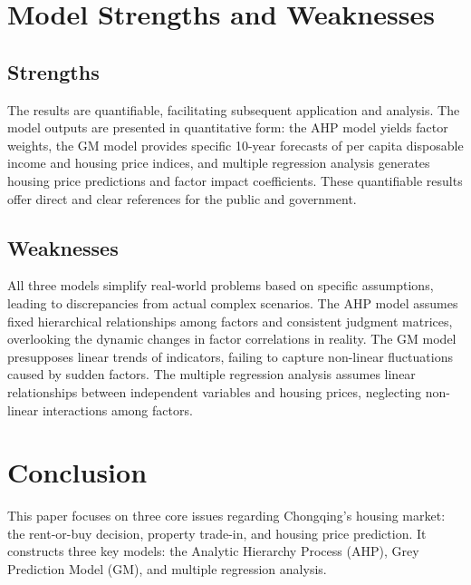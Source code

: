 \documentclass{mcmthesis}
\begin{document}
\section{Model Strengths and Weaknesses} %

\subsection{Strengths} %

The results are quantifiable, facilitating subsequent application and analysis.
The model outputs are presented in quantitative form: the AHP model yields factor weights, 
the GM model provides specific 10-year forecasts of per capita disposable income and housing price indices, 
and multiple regression analysis generates housing price predictions and factor impact coefficients. 
These quantifiable results offer direct and clear references for the public and government.

\subsection{Weaknesses} %

All three models simplify real-world problems based on specific assumptions, 
leading to discrepancies from actual complex scenarios. 
The AHP model assumes fixed hierarchical relationships among factors and consistent judgment matrices, 
overlooking the dynamic changes in factor correlations in reality. The GM model presupposes linear trends of indicators, 
failing to capture non-linear fluctuations caused by sudden factors. 
The multiple regression analysis assumes linear relationships between independent variables and housing prices, 
neglecting non-linear interactions among factors.

\section{Conclusion} %

This paper focuses on three core issues regarding Chongqing's housing market: the rent-or-buy decision, 
property trade-in, and housing price prediction. It constructs three key models: the Analytic Hierarchy Process (AHP),
Grey Prediction Model (GM), and multiple regression analysis.
\end{document}
